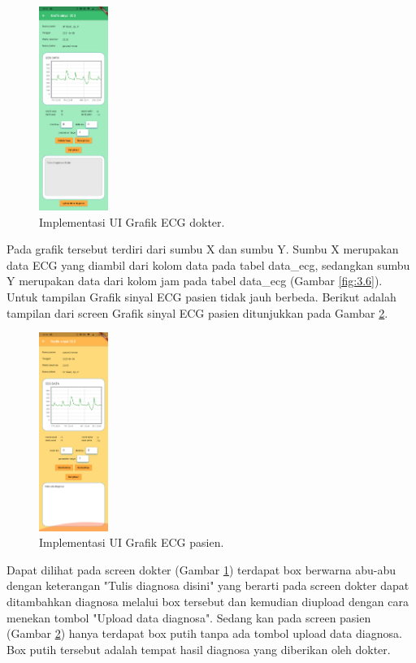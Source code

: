 \documentclass[conference]{IEEEtran}
\begin{document}
	\begin{figure}[h] \centering
		\includegraphics[width=0.2\textwidth]{img/layar_grafikECGdokter.png}
		\caption{Implementasi UI Grafik ECG dokter.}
		\label{fig:3.7}
	\end{figure}
	
	Pada grafik tersebut terdiri dari sumbu X dan sumbu Y. Sumbu X merupakan data ECG yang diambil dari kolom data pada tabel data\_ecg, sedangkan sumbu Y merupakan data dari kolom jam pada tabel data\_ecg (Gambar \ref{fig:3.6}). Untuk tampilan Grafik sinyal ECG pasien tidak jauh berbeda. Berikut adalah tampilan dari screen Grafik sinyal ECG pasien ditunjukkan pada Gambar \ref{fig:3.8}.
	
	\begin{figure}[h] \centering
		\includegraphics[width=0.2\textwidth]{img/layar_grafikECGpasien.png}
		\caption{Implementasi UI Grafik ECG pasien.}
		\label{fig:3.8}
	\end{figure}
	
	Dapat dilihat pada screen dokter (Gambar \ref{fig:3.7}) terdapat box berwarna abu-abu dengan keterangan "Tulis diagnosa disini" yang berarti pada screen dokter dapat ditambahkan diagnosa melalui box tersebut dan kemudian diupload dengan cara menekan tombol "Upload data diagnosa". Sedang kan pada screen pasien (Gambar \ref{fig:3.8}) hanya terdapat box putih tanpa ada tombol upload data diagnosa. Box putih tersebut adalah tempat hasil diagnosa yang diberikan oleh dokter.
	
\end{document}
